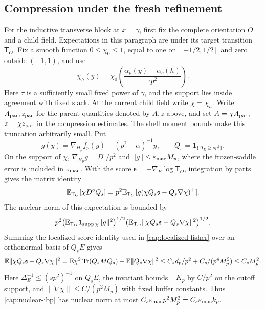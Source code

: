 \subsection{Compression under the fresh refinement}\label{cap:compression-proof}
For the inductive transverse block at \(x=\gamma\), first fix the complete
orientation \(O\) and a child field. Expectations in this paragraph are under
its target transition \(\mathsf T_O\). Fix a smooth function
\(0\le\chi_0\le1\), equal to one on \([-1/2,1/2]\) and zero outside
\((-1,1)\), and use
\begin{equation}\label{cap:field-cutoff}
 \chi_h(y)=\chi_0\!\left(
       \frac{\alpha_p(y)-\alpha_c(h)}{\tau p^2}\right).
\end{equation}
Here \(\tau\) is a sufficiently small fixed power of \(\gamma\), and
the support lies inside agreement with fixed slack. At the current child
field write \(\chi=\chi_h\). Write
\(A_{\rm par},z_{\rm par}\) for the parent quantities denoted by \(A,z\)
above, and set \(A=\chi A_{\rm par}\), \(z=\chi z_{\rm par}\) in the
compression estimates. The shell moment bounds make this truncation
arbitrarily small. Put
\[
 g(y)=\nabla_{H_p}f_p(y)-(p^2+\alpha)^{-1}y,\qquad
 Q_s=\mathbf1_{\{\Delta_E\ge sp^2\}} .
\]
On the support of \(\chi\),
\(\nabla_{H_p}g=D^\circ/p^2\) and
\(\|g\|\le\varepsilon_{\rm mac}M_p\), where the frozen-saddle error is
included in \(\varepsilon_{\rm mac}\). With the score
\(\mathfrak s=-\nabla_E\log\mathsf T_O\), integration by parts gives the
matrix identity
\begin{equation}\label{cap:nuclear-ibp}
 \mathbb E_{\mathsf T_O}[\chi D^\circ Q_s]
 =p^2\mathbb E_{\mathsf T_O}
    [g(\chi Q_s\mathfrak s-Q_s\nabla\chi)^\top].
\end{equation}
The nuclear norm of this expectation is bounded by
\[
 p^2\bigl(\mathbb E_{\mathsf T_O}\mathbf1_{\operatorname{supp}\chi}\|g\|^2\bigr)^{1/2}
       \bigl(\mathbb E_{\mathsf T_O}
          \|\chi Q_s\mathfrak s-Q_s\nabla\chi\|^2\bigr)^{1/2}.
\]
Summing the localized score identity used in
\eqref{cap:localized-fisher} over an orthonormal basis of \(Q_sE\) gives
\[
 \mathbb E\|\chi Q_s\mathfrak s-Q_s\nabla\chi\|^2
 =\mathbb E\chi^2\operatorname{Tr}(Q_sMQ_s)+\mathbb E\|Q_s\nabla\chi\|^2
 \le C_s d_p/p^2+C_s/(p^4M_p^2)
 \le C_sM_p^2.
\]
Here \(\Delta_E^{-1}\le(sp^2)^{-1}\) on \(Q_sE\), the invariant bounds
\(-K_p\) by \(C/p^2\) on the cutoff support, and
\(\|\nabla\chi\|\le C/(p^2M_p)\) with fixed buffer constants.
Thus \eqref{cap:nuclear-ibp} has nuclear norm at most
\(C_s\varepsilon_{\rm mac}p^2M_p^2
=C_s\varepsilon_{\rm mac}k_p\).

